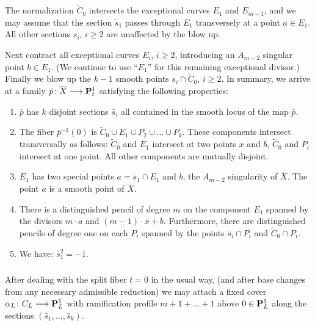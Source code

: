 \documentclass[reqno, 10 pt]{article}
\theoremstyle{definition}
\theoremstyle{remark}
\numberwithin{equation}{section}
\numberwithin{thm}{section}
\numberwithin{prop}{section}
\numberwithin{lem}{section}
\numberwithin{cor}{section}
\numberwithin{conj}{section}
\numberwithin{defn}{section}
\renewcommand{\to}{\longrightarrow}
\renewcommand{\P}{{\bf P}}
\newcommand {\from}{{\colon}}
\begin{document}
     The normalization $\widetilde{C}_{0}$ intersects the exceptional curves $E_{1}$ and $E_{m-1}$, and we may assume that the section $\widetilde{s}_{1}$ passes through $E_{1}$ transversely at a point $a \in E_{1}$.  All other sections $s_{i}$, $i \geq 2$ are unaffected by the blow up. 
     
     Next contract all exceptional curves $E_{i}$, $i \geq 2$, introducing an $A_{m-2}$ singular point $b \in E_{1}$. (We continue to use ``$E_{1}$'' for this remaining exceptional divisor.) Finally we blow up the $k-1$ smooth points $s_{i} \cap \widetilde{C}_{0}$, $i \geq 2$.  In summary, we arrive at a family $\bar{p} \from \overline{X} \to \P^{1}_{t}$ satisfying the following properties: 
 
    \begin{enumerate}
    \item $\bar{p}$ has $k$ disjoint sections $\bar{s}_{i}$ all contained in the smooth locus of the map $\bar{p}$.
    \item The fiber $\bar{p}^{-1}(0)$ is $\widetilde{C}_{0} \cup E_{1} \cup P_{2} \cup ... \cup P_{k}$. These components intersect transversally as follows: $\widetilde{C}_{0}$ and $E_{1}$ intersect at two points $x$ and $b$, $\widetilde{C}_{0}$ and $P_{i}$ intersect at one point. All other components are mutually disjoint.
    \item  $E_{1}$ has two special points $a = \bar{s}_{1} \cap E_{1}$ and $b$, the $A_{m-2}$ singularity of $\overline{X}$. The point $a$ is a smooth point of $\overline{X}$. 
    \item There is a distinguished pencil of degree $m$ on the component $E_{1}$ spanned by the divisors $m\cdot a$ and $(m-1)\cdot x + b$.  Furthermore, there are distinguished pencils of degree one on each $P_{i}$ spanned by the points $\bar{s}_{i} \cap P_{i}$ and $\widetilde{C}_{0} \cap P_{i}$.
    \item We have: $\bar{s}_{1}^{2} = -1$.
    \end{enumerate}

  \subsubsection{}  
    After dealing with the split fiber $t=0$ in the usual way, (and after base changes from any necessary admissible reduction) we may attach  a fixed cover $\alpha_{L} \from C_{L} \to \P^{1}_{L}$ with ramification profile $m + 1+ ... +1$ above $0 \in \P^{1}_{L}$ along the sections $(\bar{s}_{1}, ... , \bar{s}_{k})$.  
\end{document}

